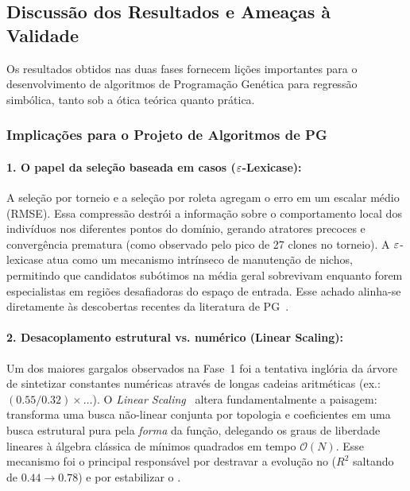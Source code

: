 \subsection{Discussão dos Resultados e Ameaças à Validade}
\label{sec:discussao}

Os resultados obtidos nas duas fases fornecem lições importantes para o
desenvolvimento de algoritmos de Programação Genética para regressão simbólica,
tanto sob a ótica teórica quanto prática.

\subsubsection{Implicações para o Projeto de Algoritmos de PG}

\paragraph{1. O papel da seleção baseada em casos ($\varepsilon$-Lexicase):}
A seleção por torneio e a seleção por roleta agregam o erro em um escalar
médio (RMSE). Essa compressão destrói a informação sobre o comportamento local
dos indivíduos nos diferentes pontos do domínio, gerando atratores precoces e
convergência prematura (como observado pelo pico de 27 clones no torneio).
A $\varepsilon$-lexicase atua como um mecanismo intrínseco de manutenção de nichos,
permitindo que candidatos subótimos na média geral sobrevivam enquanto
forem especialistas em regiões desafiadoras do espaço de entrada. Esse achado
alinha-se diretamente às descobertas recentes da literatura de
PG~\cite{helmuth2015lexicase,lacava2016epsilon}.

\paragraph{2. Desacoplamento estrutural vs. numérico (Linear Scaling):}
Um dos maiores gargalos observados na Fase~1 foi a tentativa inglória da árvore
de sintetizar constantes numéricas através de longas cadeias aritméticas
(ex.: $(0.55/0.32) \times \dots$). O \emph{Linear Scaling}~\cite{keijzer2003improving}
altera fundamentalmente a paisagem: transforma uma busca não-linear conjunta
por topologia e coeficientes em uma busca estrutural pura pela \emph{forma} da
função, delegando os graus de liberdade lineares à álgebra clássica de mínimos
quadrados em tempo $\mathcal{O}(N)$. Esse mecanismo foi o principal
responsável por destravar a evolução no  ($R^2$ saltando de
$0.44 \to 0.78$) e por estabilizar o .

